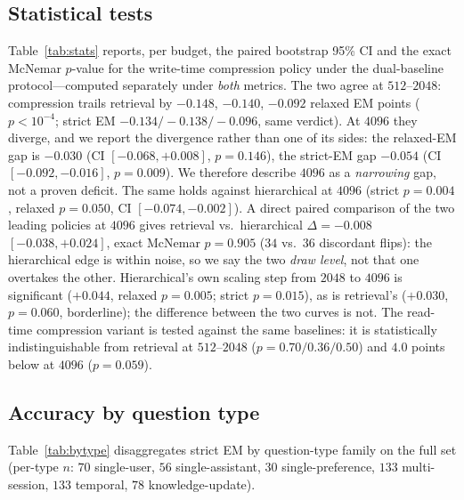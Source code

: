 \documentclass{article} %
\begin{document}
\subsection{Statistical tests}
Table~\ref{tab:stats} reports, per budget, the paired bootstrap 95\% CI and the exact McNemar
$p$-value for the write-time compression policy under the dual-baseline protocol---computed
separately under \emph{both} metrics. The two agree at $512$--$2048$: compression trails
retrieval by $-0.148$, $-0.140$, $-0.092$ relaxed EM points ($p<10^{-4}$; strict EM
$-0.134/-0.138/-0.096$, same verdict). At $4096$ they diverge, and we report the divergence
rather than one of its sides: the relaxed-EM gap is $-0.030$ (CI $[-0.068,+0.008]$,
$p{=}0.146$), the strict-EM gap $-0.054$ (CI $[-0.092,-0.016]$, $p{=}0.009$). We therefore
describe $4096$ as a \emph{narrowing} gap, not a proven deficit. The same holds against
hierarchical at $4096$ (strict $p{=}0.004$, relaxed $p{=}0.050$, CI $[-0.074,-0.002]$). A
direct paired comparison of the two leading policies at $4096$ gives retrieval vs.\
hierarchical $\Delta{=}-0.008$ $[-0.038,+0.024]$, exact McNemar $p{=}0.905$ ($34$ vs.\
$36$ discordant flips): the hierarchical edge is within noise, so we say the two
\emph{draw level}, not that one overtakes the other. Hierarchical's own scaling step from
$2048$ to $4096$ is significant ($+0.044$, relaxed $p{=}0.005$; strict $p{=}0.015$), as is
retrieval's ($+0.030$, $p{=}0.060$, borderline); the difference between the two curves is not.
The read-time compression variant is tested against the same baselines: it is statistically
indistinguishable from retrieval at $512$--$2048$ ($p{=}0.70/0.36/0.50$) and $4.0$ points
below at $4096$ ($p{=}0.059$).

\begin{table}[h]
\centering\scriptsize
\caption{Per-budget paired statistics for the write-time compression policy, reported
separately under strict EM (left) and relaxed EM (right); $\Delta$ is compression minus
baseline, so negative means compression is worse. The two metrics agree at $512$--$2048$ and
diverge at $4096$. Primary comparison against BM25 retrieval; the strongest non-compression
alternative at $4096$ appears as a second row. Source \texttt{tables500/stats.tex}.}
\label{tab:stats}
\setlength{\tabcolsep}{2.5pt}

\end{table}

\subsection{Accuracy by question type}
Table~\ref{tab:bytype} disaggregates strict EM by question-type family on the full set
(per-type $n$: $70$ single-user, $56$ single-assistant, $30$ single-preference, $133$
multi-session, $133$ temporal, $78$ knowledge-update).
\end{document}
